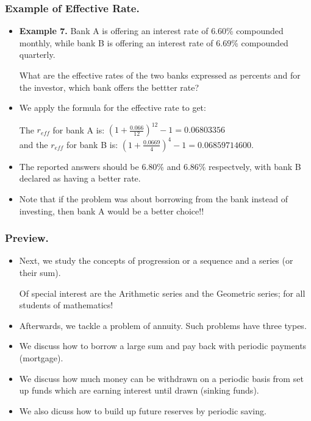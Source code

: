 %
\begin{frame}%
  \frametitle{Example of Effective Rate.}
  \begin{itemize}%
\item {\bf Example 7.}
Bank A is offering an interest rate of $6.60$\% compounded monthly,
while bank B is offering an interest rate of $6.69$\% compounded quarterly.

What are the effective rates of the two banks expressed as percents and 
for the investor, which bank offers the bettter rate?

\item We apply the formula for the effective rate to get:

The $r_{eff}$ for bank A is:
$\left(1+\frac{0.066}{12}\right)^{12} -1 = 0.06803356$\\
and the $r_{eff}$ for bank B is:
$\left(1+\frac{0.0669}{4}\right)^{4} -1 =0.06859714600.$
\item The reported answers should be $6.80$\% and $6.86$\% respectvely,
with bank B declared as having a better rate.
\item Note that if the problem was about borrowing from the bank
instead of investing, then bank A would be a better choice!!

\end{itemize}
\end{frame}
%

\begin{frame}%
  \frametitle{Preview.}
  \begin{itemize}%
\item Next, we study the concepts of progression or a sequence and a
series (or their sum).

Of special interest are the Arithmetic series and the Geometric series;
 for all students of mathematics!

\item Afterwards, we tackle a problem of annuity. Such problems have three types.
\item We discuss how to  borrow a large sum and pay back with periodic payments
(mortgage).
\item
We discuss  how much money can be
withdrawn on a periodic basis from set up funds which are earning
interest until drawn (sinking funds).

\item  We also dicuss how to build up future reserves by periodic
saving.
 

\end{itemize}
\end{frame}

